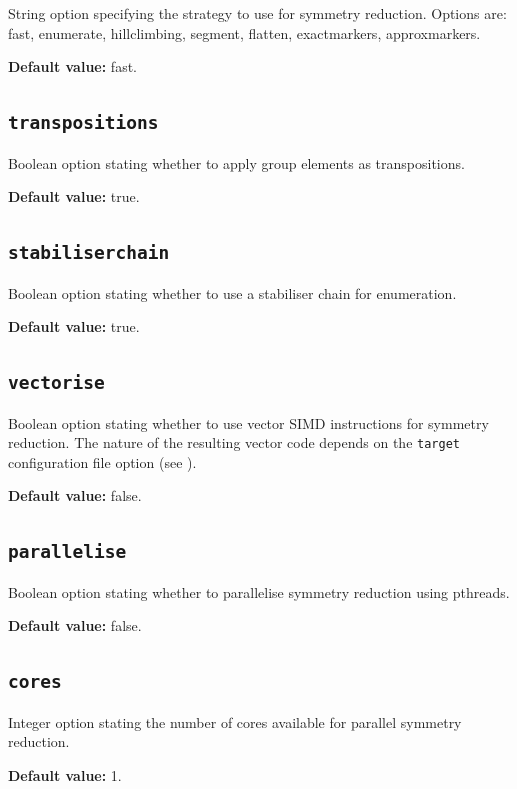 String option specifying the strategy to use for symmetry reduction.  Options are: fast, enumerate, hillclimbing, segment, flatten, exactmarkers, approxmarkers.

\noindent\textbf{Default value: } fast.

\subsection{\texttt{transpositions}}

Boolean option stating whether to apply group elements as transpositions.

\noindent\textbf{Default value: } true.

\subsection{\texttt{stabiliserchain}}

Boolean option stating whether to use a stabiliser chain for enumeration.

\noindent\textbf{Default value: } true.

\subsection{\texttt{vectorise}}

Boolean option stating whether to use vector SIMD instructions for symmetry reduction.  The nature of the resulting
vector code depends on the \texttt{target} configuration file option (see ).

\noindent\textbf{Default value: } false.

\subsection{\texttt{parallelise}}

Boolean option stating whether to parallelise symmetry reduction using pthreads.

\noindent\textbf{Default value: } false.

\subsection{\texttt{cores}}

Integer option stating the number of cores available for parallel symmetry reduction.

\noindent\textbf{Default value: } 1.

